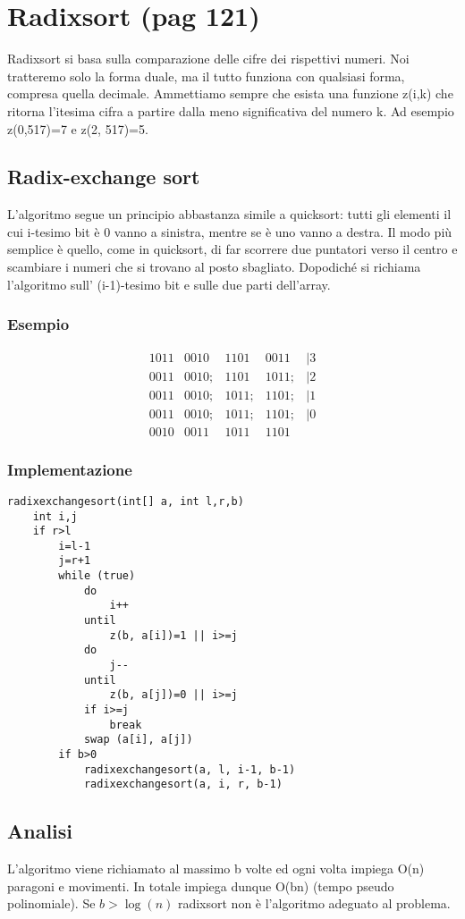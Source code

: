 \documentclass[a4paper]{book}
\begin{document}
\section{Radixsort (pag 121)}
Radixsort si basa sulla comparazione delle cifre dei rispettivi numeri. Noi tratteremo solo la forma duale, ma il tutto funziona con qualsiasi forma, compresa quella decimale. Ammettiamo sempre che esista una funzione z(i,k) che ritorna l'itesima cifra a partire dalla meno significativa del numero k. Ad esempio z(0,517)=7 e z(2, 517)=5.
\subsection{Radix-exchange sort}
L'algoritmo segue un principio abbastanza simile a quicksort: tutti gli elementi il cui i-tesimo bit è 0 vanno a sinistra, mentre se è uno vanno a destra. Il modo più semplice è quello, come in quicksort, di far scorrere due puntatori verso il centro e scambiare i numeri che si trovano al posto sbagliato. Dopodiché si richiama l'algoritmo sull' (i-1)-tesimo bit e sulle due parti dell'array.
\subsubsection*{Esempio}
\[\begin{array}{*{20}{c}}
{1011}&{0010}&{1101}&{0011}&{|3}\\
{0011}&{0010;}&{1101}&{1011;}&{|2}\\
{0011}&{0010;}&{1011;}&{1101;}&{|1}\\
{0011}&{0010;}&{1011;}&{1101;}&{|0}\\
{0010}&{0011}&{1011}&{1101}
\end{array}\]
\subsubsection*{Implementazione}
\begin{lstlisting}
radixexchangesort(int[] a, int l,r,b)
	int i,j
	if r>l
		i=l-1
		j=r+1
		while (true)
			do
				i++
			until
				z(b, a[i])=1 || i>=j
			do
				j--
			until
				z(b, a[j])=0 || i>=j
			if i>=j
				break
			swap (a[i], a[j])
		if b>0
			radixexchangesort(a, l, i-1, b-1)
			radixexchangesort(a, i, r, b-1)						
\end{lstlisting}
\subsection*{Analisi}
L'algoritmo viene richiamato al massimo b volte ed ogni volta impiega O(n) paragoni e movimenti. In totale impiega dunque O(bn) (tempo pseudo polinomiale). Se $b> \log (n)$ radixsort non è l'algoritmo adeguato al problema. 
\end{document}
